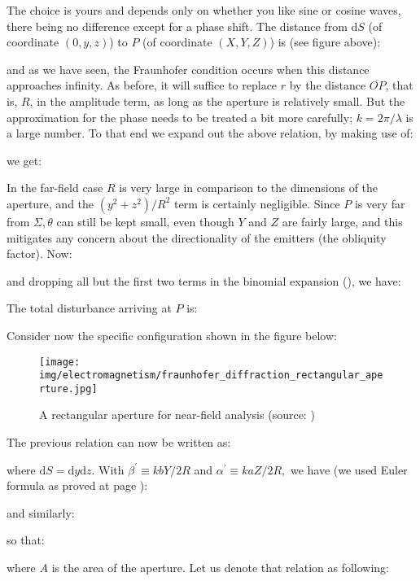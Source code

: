 	The choice is yours and depends only on whether you like sine or cosine waves, there being no difference except for a phase shift. The distance from $\mathrm{d}S$ (of coordinate $(0,y,z)$) to $P$ (of coordinate $(X,Y,Z)$) is (see figure above):
	
	and as we have seen, the Fraunhofer condition occurs when this distance approaches infinity. As before, it will suffice to replace $r$ by the distance $\overline{OP}$, that is, $R$, in the amplitude term, as long as the aperture is relatively small. But the approximation for the phase needs to be treated a bit more carefully; $k=2 \pi / \lambda$ is a large number. To that end we expand out the above relation, by making use of:
	
	we get:
	
	In the far-field case $R$ is very large in comparison to the dimensions of the aperture, and the $\left(y^{2}+z^{2}\right) / R^{2}$ term is certainly negligible. Since $P$ is very far from $\Sigma, \theta$ can still be kept small, even though $Y$ and $Z$ are fairly large, and this mitigates any concern about the directionality of the emitters (the obliquity factor). Now:
	
	and dropping all but the first two terms in the binomial expansion (), we have:
	
	The total disturbance arriving at $P$ is:
	
	Consider now the specific configuration shown in  the figure below:
	\begin{figure}[H]
		\centering
		\texttt{[image: img/electromagnetism/fraunhofer\_diffraction\_rectangular\_aperture.jpg]}
		\caption[]{A rectangular aperture for near-field analysis (source: \cite{hecht2016optics})}
	\end{figure}
	The previous relation can now be written as:
	
	where $\mathrm{d} S=\mathrm{d} y \mathrm{d} z$. With $\beta^{\prime} \equiv k b Y / 2 R$ and $\alpha^{\prime} \equiv k a Z / 2 R,$ we have (we used Euler formula as proved at page \pageref{euler formula}):
	
	and similarly:
	
	so that:
	
	where $A$ is the area of the aperture. Let us denote that relation as following:
	
